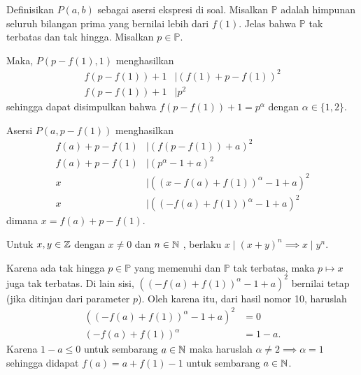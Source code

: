 
\begin{solusi}
    Definisikan $P(a,b)$ sebagai asersi ekspresi di soal. Misalkan $\mathbb{P}$ adalah himpunan seluruh bilangan prima yang bernilai lebih dari $f(1)$. Jelas bahwa $\mathbb{P}$ tak terbatas dan tak hingga. Misalkan $p \in \mathbb{P}$.

    Maka, $P(p-f(1),1)$ menghasilkan 
    \begin{align*}
        f(p-f(1))+1 &\mid (f(1)+p-f(1))^2\\
        f(p-f(1))+1 &\mid p^2
    \end{align*}
    sehingga dapat disimpulkan bahwa $f(p-f(1))+1 = p^\alpha$ dengan $\alpha \in \{1,2\}$.

    Asersi $P(a, p-f(1))$ menghasilkan
    \begin{align*}
        f(a)+p-f(1) &\mid (f(p-f(1))+a)^2\\
        f(a)+p-f(1) &\mid (p^\alpha-1+a)^2\\
        x &\mid ((x-f(a)+f(1))^\alpha-1+a)^2\\
        x &\mid ((-f(a)+f(1))^\alpha-1+a)^2
    \end{align*}
    dimana $x=f(a)+p-f(1)$.

    \begin{remark*}
        Untuk $x,y \in \mathbb Z$ dengan $x \neq 0$ dan $n \in \mathbb N$ , berlaku $x \mid (x+y)^n \implies x \mid y^n$.
    \end{remark*}
    
    Karena ada tak hingga $p \in \mathbb{P}$ yang memenuhi dan $\mathbb{P}$ tak terbatas, maka $p \mapsto x$ juga tak terbatas. Di lain sisi, $((-f(a)+f(1))^\alpha-1+a)^2$ bernilai tetap (jika ditinjau dari parameter $p$). Oleh karena itu, dari hasil nomor 10, haruslah \begin{align*}
        ((-f(a)+f(1))^\alpha-1+a)^2&=0\\
        (-f(a)+f(1))^\alpha &= 1-a.
    \end{align*}
    Karena $1-a \le 0$ untuk sembarang $a \in \mathbb N$ maka haruslah $\alpha \neq 2 \implies \alpha = 1$ sehingga didapat $f(a) = a+f(1)-1$ untuk sembarang $a \in \mathbb N$.   
\end{solusi}